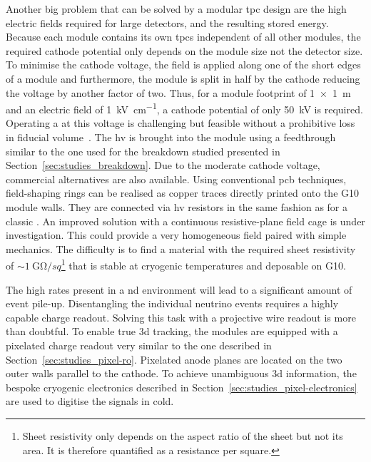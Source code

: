 Another big problem that can be solved by a modular \gls{tpc} design are the high electric fields required for large detectors, and the resulting stored energy.
Because each module contains its own \glspl{tpc} independent of all other modules, the required cathode potential only depends on the module size not the detector size.
To minimise the cathode voltage, the field is applied along one of the short edges of a module and furthermore, the module is split in half by the cathode reducing the voltage by another factor of two.
Thus, for a module footprint of \SI{1 x 1}{\metre} and an electric field of \SI{1}{\kilo\volt\per\centi\metre}, a cathode potential of only \SI{50}{\kilo\volt} is required.
Operating a \lartpc{} at this voltage is challenging but feasible without a prohibitive loss in fiducial volume~\cite{AT}.
The \gls{hv} is brought into the module using a feedthrough similar to the one used for the breakdown studied presented in Section~\ref{sec:studies_breakdown}.
Due to the moderate cathode voltage, commercial alternatives are also available.
Using conventional \gls{pcb} techniques, field-shaping rings can be realised as copper traces directly printed onto the G10 module walls.
They are connected via \gls{hv} resistors in the same fashion as for a classic \lartpc{}.
An improved solution with a continuous resistive-plane field cage is under investigation.
This could provide a very homogeneous field paired with simple mechanics.
The difficulty is to find a material with the required sheet resistivity of $\sim{\SI{1}{\giga\ohm\per sq}}$\footnote{Sheet resistivity only depends on the aspect ratio of the sheet but not its area. It is therefore quantified as a resistance per square.} that is stable at cryogenic temperatures and deposable on G10.

The high rates present in a \gls{nd} environment will lead to a significant amount of event pile-up.
Disentangling the individual neutrino events requires a highly capable charge readout.
Solving this task with a projective wire readout is more than doubtful.
To enable true \gls{3d} tracking, the modules are equipped with a pixelated charge readout very similar to the one described in Section~\ref{sec:studies_pixel-ro}.
Pixelated anode planes are located on the two outer walls parallel to the cathode.
To achieve unambiguous \gls{3d} information, the bespoke \larpix{} cryogenic electronics described in Section~\ref{sec:studies_pixel-electronics} are used to digitise the signals in cold.

